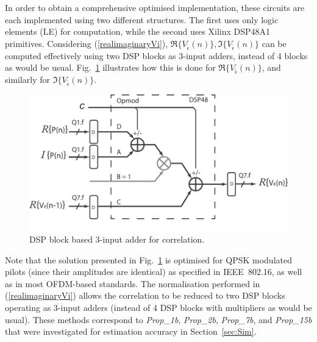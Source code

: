 In order to obtain a comprehensive optimised implementation, these circuits are each implemented using two different structures.
The first uses only logic elements (LE) for computation, while the second uses Xilinx DSP48A1 \cite{ug389} primitives.
Considering (\ref{realimaginaryVi}), $\Re{\{V_{\tilde{\epsilon}}(n)\}}, \Im{\{V_{\tilde{\epsilon}}(n)\}}$ can be computed effectively using two DSP blocks as 3-input adders, instead of 4 blocks as would be usual.
Fig.~\ref{fig:DSP48Acc} illustrates how this is done for $\Re{\{V_{\tilde{\epsilon}}(n)\}}$, and similarly for $\Im{\{V_{\tilde{\epsilon}}(n)\}}$.
\begin{figure}
	\centerline{\includegraphics [width=0.7\columnwidth] {figures/DSP48Acc.pdf} }
	\caption{DSP block based 3-input adder for correlation.}
	\label{fig:DSP48Acc}
\end{figure}
Note that the solution presented in Fig.~\ref{fig:DSP48Acc} is optimised for QPSK modulated pilots (since their amplitudes are identical) as specified in IEEE~802.16, as well as in most OFDM-based standards.
The normalisation performed in (\ref{realimaginaryVi}) allows the correlation to be reduced to two DSP blocks operating as 3-input adders (instead of 4 DSP blocks with multipliers as would be usual).
These methods correspond to \emph{Prop\_1b}, \emph{Prop\_2b}, \emph{Prop\_7b}, and \emph{Prop\_15b} that were investigated for estimation accuracy in Section~\ref{sec:Sim}.

